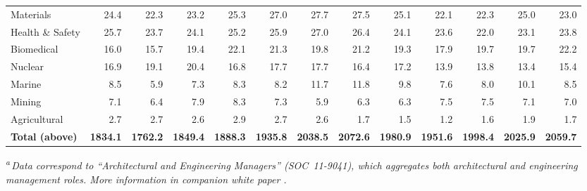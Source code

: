 \begin{table}[htbp]
\begin{tabular}{@{}lrrrrrrrrrrrr@{}}
    Materials & 24.4 & 22.3 & 23.2 & 25.3 & 27.0 & 27.7 & 27.5 & 25.1 & 22.1 & 22.3 & 25.0 & 23.0 \\
    Health \& Safety & 25.7 & 23.7 & 24.1 & 25.2 & 25.9 & 27.0 & 26.4 & 24.1 & 23.6 & 22.0 & 23.1 & 23.8 \\
    Biomedical & 16.0 & 15.7 & 19.4 & 22.1 & 21.3 & 19.8 & 21.2 & 19.3 & 17.9 & 19.7 & 19.7 & 22.2 \\
    Nuclear & 16.9 & 19.1 & 20.4 & 16.8 & 17.7 & 17.7 & 16.4 & 17.2 & 13.9 & 13.8 & 13.4 & 15.4 \\
    Marine & 8.5 & 5.9 & 7.3 & 8.3 & 8.2 & 11.7 & 11.8 & 9.8 & 7.6 & 8.0 & 10.1 & 8.5 \\
    Mining & 7.1 & 6.4 & 7.9 & 8.3 & 7.3 & 5.9 & 6.3 & 6.3 & 7.5 & 7.5 & 7.1 & 7.0 \\
    Agricultural & 2.7 & 2.7 & 2.6 & 2.9 & 2.7 & 2.6 & 1.7 & 1.5 & 1.2 & 1.6 & 1.9 & 1.7 \\
    \midrule
    \bfseries Total (above) & \bfseries 1834.1 & \bfseries 1762.2 & \bfseries 1849.4 & \bfseries 1888.3 & \bfseries 1935.8 & \bfseries 2038.5 & \bfseries 2072.6 & \bfseries 1980.9 & \bfseries 1951.6 & \bfseries 1998.4 & \bfseries 2025.9 & \bfseries 2059.7 \\
    \bottomrule
  \end{tabular}
  \vspace{4pt}
  \parbox{0.98\linewidth}{
    \footnotesize\textit{\textsuperscript{a}\,Data correspond to ``Architectural and Engineering Managers'' (SOC~11-9041), which aggregates both architectural and engineering management roles. More information in companion white paper \cite{versteeg2026bls}.}
  }
\end{table}
